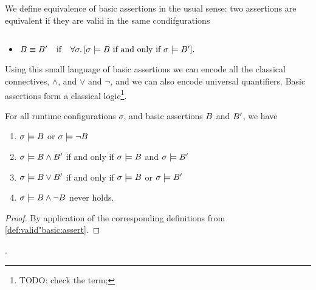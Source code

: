 We define equivalence of basic assertions in the usual sense: two assertions are equivalent if they are valid in the same condifgurations

\begin{definition} 
$ ~ $ 

\begin{itemize}
\item
$B \equiv B'  {{\hspace{.1in}} {\mbox{ if }} {\hspace{.1in}}}    \forall \sigma.\, [\sigma \models B \mbox{ if and only if } \sigma \models B'].$
\end{itemize}
\end{definition}

Using this small language of basic assertions we can encode all the classical connectives, \ie $\wedge$, and $\vee$ and $\neg$, and we can also encode universal quantifiers. Basic assertions form a classical logic\footnote{TODO: check the term;}.

\begin{lemma}
For all runtime configurations $\sigma$, and basic assertions $B$ and $B'$, we have
\begin{enumerate}
\item 
$\sigma \models B$ or $\sigma \models \neg B$
\item
$\sigma \models B \wedge B'$ \SP if and only if \SP $\sigma \models B$ and  $\sigma \models B'$ 
\item
$\sigma \models B \vee B'$ \SP if and only if \SP $\sigma \models B$ or  $\sigma \models B'$ 
\item
$\sigma \models B \wedge \neg B$ never holds.
\end{enumerate}
\end{lemma}
\begin{proof} By application of the corresponding definitions from \ref{def:valid"basic:assert}.\end{proof}.

